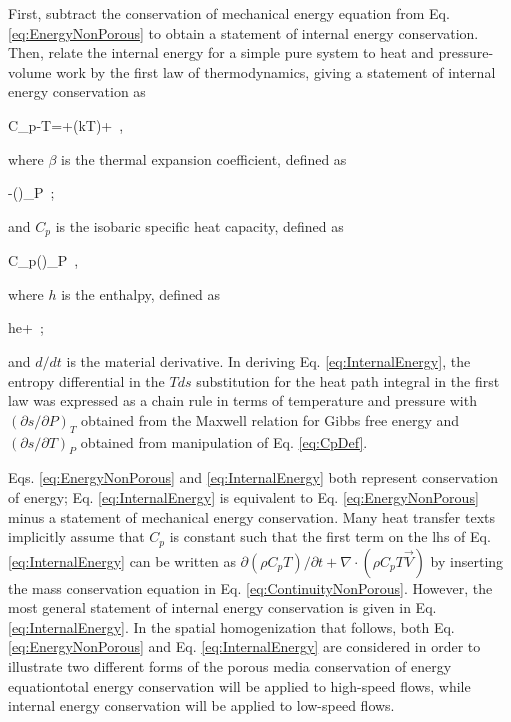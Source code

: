 First, subtract the conservation of mechanical energy equation from Eq. \eqref{eq:EnergyNonPorous} to obtain a statement of internal energy conservation. Then, relate the internal energy for a simple pure system to heat and pressure-volume work by the first law of thermodynamics, giving a statement of internal energy conservation as

\beq
\label{eq:InternalEnergy}
\rho C_{p}-\beta T=\tau\colon\nabla{}+\nabla\cdot(k\nabla T)+\ ,
\eeq

\noindent where \(\beta\) is the thermal expansion coefficient, defined as

\beq
\label{eq:BetaDef}
\beta\equiv-\left(\right)_P\ ;
\eeq

\noindent and \(C_p\) is the isobaric specific heat capacity, defined as

\beq
\label{eq:CpDef}
C_p\equiv\left(\right)_P\ ,
\eeq

\noindent where \(h\) is the enthalpy, defined as

\beq
\label{eq:EnthalpyDef}
h\equiv e+\ ;
\eeq

\noindent and \(d/dt\) is the material derivative. In deriving Eq. \eqref{eq:InternalEnergy}, the entropy differential in the \(Tds\) substitution for the heat path integral in the first law was expressed as a chain rule in terms of temperature and pressure with \((\partial s/\partial P)_T\) obtained from the Maxwell relation for Gibbs free energy and \((\partial s/\partial T)_P\) obtained from manipulation of Eq. \eqref{eq:CpDef}. 

Eqs. \eqref{eq:EnergyNonPorous} and \eqref{eq:InternalEnergy} both represent conservation of energy; Eq. \eqref{eq:InternalEnergy} is equivalent to Eq. \eqref{eq:EnergyNonPorous} minus a statement of mechanical energy conservation. Many heat transfer texts implicitly assume that \(C_p\) is constant such that the first term on the \gls{lhs} of Eq. \eqref{eq:InternalEnergy} can be written as \(\partial(\rho C_{p}T)/\partial t+\nabla\cdot(\rho C_pT\vec{V})\) by inserting the mass conservation equation in Eq. \eqref{eq:ContinuityNonPorous}. However, the most general statement of internal energy conservation is given in Eq. \eqref{eq:InternalEnergy}. In the spatial homogenization that follows, both Eq. \eqref{eq:EnergyNonPorous} and Eq. \eqref{eq:InternalEnergy} are considered in order to illustrate two different forms of the porous media conservation of energy equation\mdash total energy conservation will be applied to high-speed flows, while internal energy conservation will be applied to low-speed flows.


